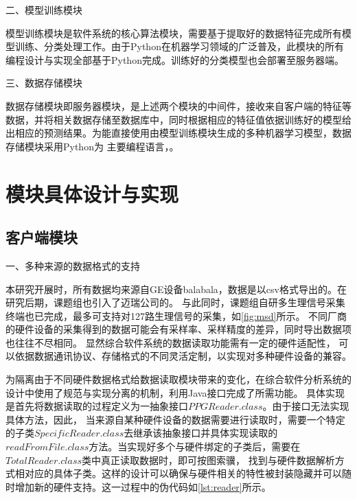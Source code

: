 二、模型训练模块

模型训练模块是软件系统的核心算法模块，需要基于提取好的数据特征完成所有模型训练、分类处理工作。由于Python在机器学习领域的广泛普及，此模块的所有编程设计与实现全部基于Python完成。训练好的分类模型也会部署至服务器端。

三、数据存储模块

数据存储模块即服务器模块，是上述两个模块的中间件，接收来自客户端的特征等数据，并将相关数据存储至数据库中，同时根据相应的特征值依据训练好的模型给出相应的预测结果。为能直接使用由模型训练模块生成的多种机器学习模型，数据存储模块采用Python为
主要编程语言，。


\section{模块具体设计与实现}
\subsection{客户端模块}


一、多种来源的数据格式的支持

本研究开展时，所有数据均来源自GE设备balabala，数据是以csv格式导出的。在研究后期，课题组也引入了迈瑞公司的。
与此同时，课题组自研多生理信号采集终端也已完成，最多可支持对127路生理信号的采集，如\autoref{fig:msd}所示。
不同厂商的硬件设备的采集得到的数据可能会有采样率、采样精度的差异，同时导出数据项也往往不尽相同。
显然综合软件系统的数据读取功能需有一定的硬件适配性，
可以依据数据通讯协议、存储格式的不同灵活定制，以实现对多种硬件设备的兼容。

为隔离由于不同硬件数据格式给数据读取模块带来的变化，在综合软件分析系统的设计中使用了规范与实现分离的机制，利用Java接口完成了所需功能。
具体实现是首先将数据读取的过程定义为一抽象接口$PPGReader.class$。由于接口无法实现具体方法，因此，
当来源自某种硬件设备的数据需要进行读取时，需要一个特定的子类$SpecificReader.class$去继承该抽象接口并具体实现读取的$readFromFile.class$方法。当实现好多个与硬件绑定的子类后，需要在$TotalReader.class$类中真正读取数据时，即可按图索骥，
找到与硬件数据解析方式相对应的具体子类。这样的设计可以确保与硬件相关的特性被封装隐藏并可以随时增加新的硬件支持。这一过程中的伪代码如\autoref{lst:reader}所示。

